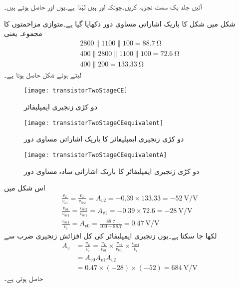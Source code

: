 آئیں جلد یک سمت تجزیہ کریں۔چونکہ  اور  ہیں لہٰذا  ہے۔یوں  اور   حاصل ہوتے ہیں۔

شکل  میں شکل  کا باریک اشاراتی مساوی دور دکھایا گیا ہے۔متوازی مزاحمتوں کا مجموعہ یعنی
\begin{align*}
2800 \mathbin{\|} 1100 \mathbin{\|} 100=\SI{88.7}{\ohm}\\
400 \mathbin{\|} 2800 \mathbin{\|} 1100 \mathbin{\|} 100=\SI{72.6}{\ohm}\\
400 \mathbin{\|} 200 =\SI{133.33}{\ohm}
\end{align*}
لیتے ہوئے شکل  حاصل ہوتا ہے۔

\begin{figure}
\centering
\texttt{[image: transistorTwoStageCE]}
\caption{دو کڑی زنجیری ایمپلیفائر}
\label{شکل_دو_کڑی_زنجیری_ایمپلیفائر}
\end{figure}
%
\begin{figure}
\centering
\texttt{[image: transistorTwoStageCEequivalent]}
\caption{دو کڑی زنجیری ایمپلیفائر کا باریک اشاراتی مساوی دور}
\label{شکل_دو_کڑی_زنجیری_ایمپلیفائر_مساوی_الف}
\end{figure}
%
\begin{figure}
\centering
\texttt{[image: transistorTwoStageCEequivalentA]}
\caption{دو کڑی زنجیری ایمپلیفائر کا باریک اشاراتی سادہ مساوی دور}
\label{شکل_دو_کڑی_زنجیری_ایمپلیفائر_سادہ_مساوی_الف}
\end{figure}

اس شکل میں
\begin{align*}
\frac{v_L}{v_{o1}}=\frac{v_L}{v_{be2}}=A_{v2}=-0.39 \times 133.33=\SI[per=frac,fraction=nice]{-52}{\volt \per \volt}\\
\frac{v_{o1}}{v_{be1}}=\frac{v_{be2}}{v_{be1}}=A_{v1}=-0.39 \times 72.6=\SI[per=frac,fraction=nice]{-28}{\volt \per \volt}\\
\frac{v_{be1}}{v_i}=A_{v0}=\frac{88.7}{100+88.7}=\SI[per=frac,fraction=nice]{0.47}{\volt \per \volt}
\end{align*}
لکھا جا سکتا ہے۔یوں زنجیری ایمپلیفائر کی کل افزائش زنجیری ضرب سے
\begin{align*}
A_v&=\frac{v_L}{v_i}=\frac{v_L}{v_{o1}} \times \frac{v_{o1}}{v_{be1}} \times \frac{v_{be1}}{v_i}\\
&=A_{v0} A_{v1} A_{v2}\\
&=0.47 \times \left(-28 \right) \times \left(-52 \right)=\SI[per=frac,fraction=nice]{684}{\volt \per \volt}
\end{align*}
حاصل ہوتی ہے۔

